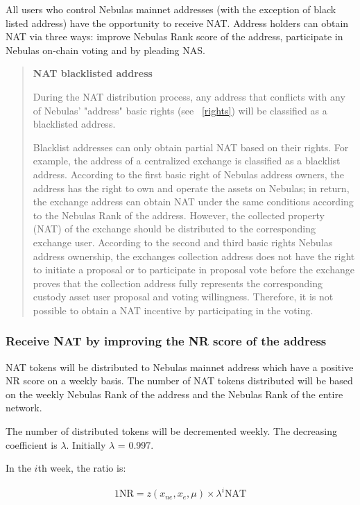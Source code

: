 All users who control Nebulas mainnet addresses (with the exception of black listed address) have the opportunity to receive NAT. Address holders can obtain NAT via three ways: improve Nebulas Rank score of the address, participate in Nebulas on-chain voting and by pleading NAS.

\begin{quotation}

\textbf{NAT blacklisted address}

During the NAT distribution process, any address that conflicts with any of Nebulas' "address" basic rights (see ~\ref{rights}) will be classified as a blacklisted address. 

Blacklist addresses can only obtain partial NAT based on their rights. For example, the address of a centralized exchange is classified as a blacklist address. According to the first basic right of Nebulas address owners, the address has the right to own and operate the assets on Nebulas; in return, the exchange address  can obtain NAT under the same conditions according to the Nebulas Rank of the address. However, the collected property (NAT) of the exchange should be distributed to the corresponding exchange user. According to the second and third basic rights Nebulas address ownership, the exchanges collection address does not have the right to initiate a proposal or to participate in proposal vote before the exchange proves that the collection address fully represents the corresponding custody asset user proposal and voting willingness. Therefore, it is not possible to obtain a NAT incentive by participating in the voting.

\end{quotation}

\subsubsection{Receive NAT by improving the NR score of the address}

NAT tokens will be distributed to Nebulas mainnet address which have a positive NR score on a weekly basis. The number of NAT tokens distributed will be based on the weekly Nebulas Rank of the address and the Nebulas Rank of the entire network.

The number of distributed tokens will be decremented weekly. The decreasing coefficient is $\lambda$. Initially $\lambda$ = 0.997.

In the $i$th week, the ratio is:

\begin{align}
1 \text{NR}=z(x_{ne},x_{e},\mu)\times\lambda^{i} \text{NAT}
\end{align} 

